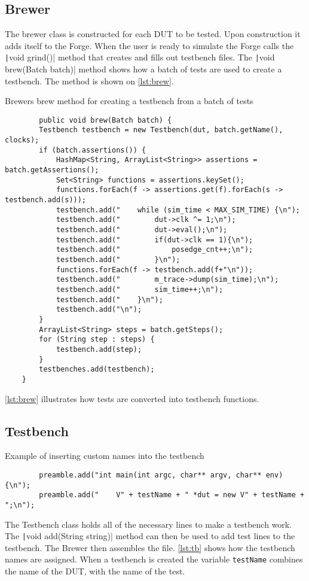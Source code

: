 \subsection{Brewer}
The brewer class is constructed for each DUT to be tested. Upon construction it adds itself to the Forge.\newline
When the user is ready to simulate the Forge calls the \texttt|void grind()| method that creates and fills out testbench files. The \texttt|void brew(Batch batch)| method shows how a batch of tests are used to create a testbench. The method is shown on \cref{lst:brew}.
\begin{listing}
    \centering
    \caption{Brewers brew method for creating a testbench from a batch of tests}\label{lst:brew}
    \begin{verbatim}
        public void brew(Batch batch) {
        Testbench testbench = new Testbench(dut, batch.getName(), clocks);
        if (batch.assertions()) {
            HashMap<String, ArrayList<String>> assertions = batch.getAssertions();
            Set<String> functions = assertions.keySet();
            functions.forEach(f -> assertions.get(f).forEach(s -> testbench.add(s)));
            testbench.add("    while (sim_time < MAX_SIM_TIME) {\n");
            testbench.add("        dut->clk ^= 1;\n");
            testbench.add("        dut->eval();\n");
            testbench.add("        if(dut->clk == 1){\n");
            testbench.add("            posedge_cnt++;\n");
            testbench.add("        }\n");
            functions.forEach(f -> testbench.add(f+"\n"));
            testbench.add("        m_trace->dump(sim_time);\n");
            testbench.add("        sim_time++;\n");
            testbench.add("    }\n");
            testbench.add("\n");
        }
        ArrayList<String> steps = batch.getSteps();
        for (String step : steps) {
            testbench.add(step);
        }
        testbenches.add(testbench);
    }
    \end{verbatim}
\end{listing}
\cref{lst:brew} illustrates how tests are converted into testbench functions.
\subsection{Testbench}
\begin{listing}
    \centering
    \caption{Example of inserting custom names into the testbench}\label{lst:tb}
    \begin{verbatim}
        preamble.add("int main(int argc, char** argv, char** env) {\n");
        preamble.add("    V" + testName + " *dut = new V" + testName + ";\n");
    \end{verbatim}
\end{listing}
The Testbench class holds all of the necessary lines to make a testbench work. The \texttt|void add(String string)| method can then be used to add test lines to the testbench. The Brewer then assembles the file. \cref{lst:tb} shows how the testbench names are assigned. When a testbench is created the variable \texttt{testName} combines the name of the DUT, with the name of the test.

